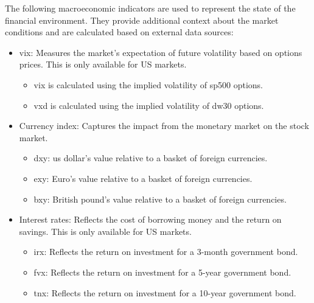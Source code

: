 The following macroeconomic indicators are used to represent the state of the financial environment. They provide additional context about the market conditions and are calculated based on external data sources:
\begin{itemize}
    \item \acrfull{vix}: Measures the market's expectation of future volatility based on options prices. This is only available for US markets.
    \begin{itemize}
        \item \acrshort{vix} is calculated using the implied volatility of \acrfull{sp500} options.
        \item \acrshort{vxd} is calculated using the implied volatility of \acrfull{dw30} options.
    \end{itemize}
    \item Currency index: Captures the impact from the monetary market on the stock market.
    \begin{itemize}
        \item \acrfull{dxy}: \acrfull{us} dollar's value relative to a basket of foreign currencies.
        \item \acrfull{exy}: Euro's value relative to a basket of foreign currencies.
        \item \acrfull{bxy}: British pound's value relative to a basket of foreign currencies.
    \end{itemize}
    \item Interest rates: Reflects the cost of borrowing money and the return on savings. This is only available for US markets.
    \begin{itemize}
        \item \acrfull{irx}: Reflects the return on investment for a 3-month government bond.
        \item \acrfull{fvx}: Reflects the return on investment for a 5-year government bond.
        \item \acrfull{tnx}: Reflects the return on investment for a 10-year government bond.
    \end{itemize}
\end{itemize}
